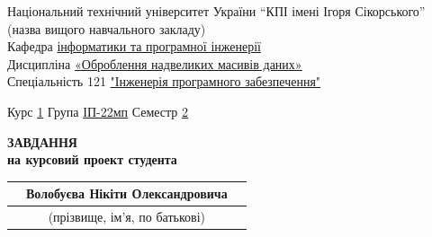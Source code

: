 \documentclass[14pt]{article}
\begin{document}
\fontsize{14}{17}\selectfont

\begin{center}
\fontsize{14}{17}\selectfont
Національний технічний університет України “КПІ імені Ігоря Сікорського”\\
\fontsize{12}{14}\selectfont
(назва вищого навчального закладу)\\
Кафедра \underline{інформатики та програмної інженерії}\\
Дисципліна \underline{«Оброблення надвеликих масивів даних»}\\
Спеціальність 121 \underline{"Інженерія програмного забезпечення"}\\
\end{center}
Курс \underline{\hspace{1em}1\hspace{1em}} Група \underline{\hspace{1em}ІП-22мп\hspace{1em}} \hfill Семестр \underline{\hspace{0.5em}2\hspace{0.5em}}\\

\fontsize{14}{17}\selectfont
\begin{center}
\textbf{ЗАВДАННЯ}\\
\textbf{на курсовий проект студента}\\

\begin{tabularx}{\textwidth}{X c X}
    & Волобуєва Нікіти Олександровича &\\
    \hline
    & \fontsize{9}{11}\selectfont (прізвище, ім’я, по батькові) &
\end{tabularx}
\end{center}
\end{document}
